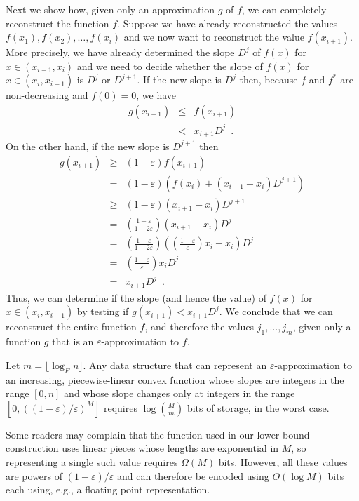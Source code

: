 \documentclass[charterfonts,lotsofwhite]{patmorin}
\newcommand{\eps}{\varepsilon}
\begin{document}
Next we show how, given only an approximation $g$ of $f$, we can
completely reconstruct the function $f$. Suppose we have already
reconstructed the values $f(x_1),f(x_2),\ldots,f(x_{i})$ and we 
now want to reconstruct the value $f(x_{i+1})$.  More precisely, we
have already determined the slope $D^j$ of $f(x)$ for $x\in
(x_{i-1},x_{i})$ and we need to decide whether the slope of $f(x)$ for
$x\in(x_i,x_{i+1})$ is $D^j$ or $D^{j+1}$.  If the new slope is $D^j$
then, because $f$ and $f^*$ are non-decreasing and $f(0)=0$, we have
\begin{eqnarray*}
   g(x_{i+1}) & \le & f(x_{i+1}) \\
    & < & x_{i+1}D^j \enspace . 
\end{eqnarray*}
On the other hand, if the new slope is $D^{j+1}$ then
\begin{eqnarray*}
   g(x_{i+1}) 
    & \ge & (1-\eps)f(x_{i+1}) \\
    & = & (1-\eps)(f(x_i) + (x_{i+1}-x_i)D^{j+1}) \\
    & \ge & (1-\eps)(x_{i+1}-x_i)D^{j+1} \\ 
    & = & \left(\frac{1-\eps}{1-2\eps}\right)(x_{i+1}-x_i)D^{j} \\ 
    & = &
\left(\frac{1-\eps}{1-2\eps}\right)\left(\left(\frac{1-\eps}{\eps}\right)x_i-x_i\right)D^{j} \\ 
    & = & \left(\frac{1-\eps}{\eps}\right)x_iD^j \\
    & = & x_{i+1}D^j \enspace .
\end{eqnarray*}
Thus, we can determine if the slope (and hence the value) of $f(x)$
for $x\in (x_i,x_{i+1})$ by testing if $g(x_{i+1}) < x_{i+1}D^j$.  We
conclude that we can reconstruct the entire function $f$, and
therefore the values $j_1,\ldots,j_m$, given only a function $g$ that
is an $\eps$-approximation to $f$. 

\begin{thm}
Let $m=\lfloor\log_E n\rfloor$.  Any data structure that can represent
an $\eps$-approximation to an increasing, piecewise-linear convex
function whose slopes are integers in the range $[0,n]$ and whose
slope changes only at integers in the range $[0,((1-\eps)/\eps)^M]$
requires $\log {M\choose m}$ bits of storage, in the worst case.
 \end{thm}

\begin{rem}
Some readers may complain that the function used in our lower bound
construction uses linear pieces whose lengths are exponential in $M$,
so representing a single such value requires $\Omega(M)$ bits.
However, all these values are powers of $(1-\eps)/\eps$ and can
therefore be encoded using $O(\log M)$ bits each using, e.g., a
floating point representation.
\end{rem}
\end{document}

